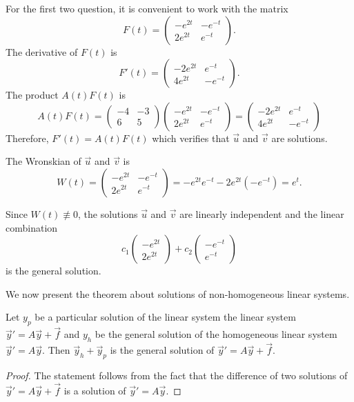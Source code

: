\begin{solution}
  For the first two question, it is convenient to work with the matrix
  \[
    F(t)=\begin{pmatrix}
    -e^{2t} & -e^{-t}\\  
    2e^{2t} & e^{-t}
  \end{pmatrix}.
  \]
  The derivative of $F(t)$ is
  \[
    F'(t)=\begin{pmatrix}
      -2e^{2t} & e^{-t}\\  
      4e^{2t} & -e^{-t}
    \end{pmatrix}.
  \]
  The product $A(t)F(t)$ is 
  \[
  A(t)F(t)= 
  \begin{pmatrix}
    -4 & -3 \\ 
    6 & 5
 \end{pmatrix} 
  \begin{pmatrix}
    -e^{2t} & -e^{-t}\\  
    2e^{2t} & e^{-t}
  \end{pmatrix}=
  \begin{pmatrix}
    -2e^{2t} & e^{-t}\\  
    4e^{2t} & -e^{-t}
  \end{pmatrix}
  \]
  Therefore, $F'(t)=A(t)F(t)$ which verifies that $\vec{u}$ and $\vec{v}$ are solutions.

  The Wronskian of $\vec{u}$ and $\vec{v}$ is 
  \[
  W(t)=\begin{pmatrix}
    -e^{2t} & -e^{-t}\\  
    2e^{2t} & e^{-t}
  \end{pmatrix} = -e^{2t}e^{-t}-2e^{2t}(-e^{-t})=e^t. 
  \]
  
  Since $W(t)\not\equiv 0$, the solutions $\vec{u}$ and $\vec{v}$ are linearly independent and the linear combination
  \[c_1\begin{pmatrix}
    -e^{2t}\\ 2e^{2t}
  \end{pmatrix} + 
  c_2 \begin{pmatrix}
    -e^{-t} \\  e^{-t}
  \end{pmatrix}
  \]
  is the general solution.
\end{solution}

We now present the theorem about solutions of non-homogeneous linear systems.

\begin{theorem}
  
  Let $y_p$ be a particular solution of the linear system the linear system $\vec{y}'=A\vec{y}+\vec{f}$ and $y_h$ be the general solution of the homogeneous linear system $\vec{y}'=A\vec{y}.$
  Then $\vec{y}_h+\vec{y}_p$ is the general solution of $\vec{y}'=A\vec{y}+\vec{f}$.
\end{theorem}
\begin{proof}
  The statement follows from the fact that 
  the difference of two solutions of $\vec{y}'=A\vec{y}+\vec{f}$ is a solution of 
  $\vec{y}'=A\vec{y}$.
\end{proof}

